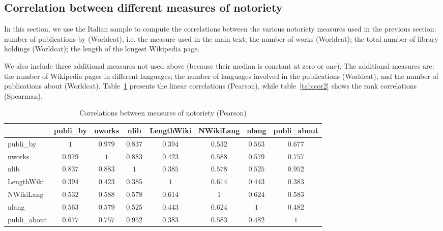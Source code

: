 \subsection{Correlation between different measures of notoriety} \label{app:cor}

In this section, we use the Italian sample to compute the correlations between the various notoriety measures used in the previous section: number of publications by (Worldcat), i.e. the measure used in the main text; the number of works (Worldcat); the total number of library holdings (Worldcat); the length of the longest Wikipedia page.

We also include three additional measures not used above (because their median is constant at zero or one). The additional measures are: the number of Wikipedia pages in different languages; the number of languages involved in the publications (Worldcat), and the number of publications about (Worldcat).
Table~\ref{tab:cor} presents the linear correlations (Pearson), while table~\ref{tab:cor2} shows the rank correlations (Spearman).


\begin{table}[!htbp] \centering
\begin{tabular}{lccccccc}
\toprule
 & publi\_by & nworks & nlib & LengthWiki & NWikiLang & nlang & publi\_about \\
\midrule
publi\_by & $1$ & $0.979$ & $0.837$ & $0.394$ & $0.532$ & $0.563$ & $0.677$ \\
nworks & $0.979$ & $1$ & $0.883$ & $0.423$ & $0.588$ & $0.579$ & $0.757$ \\
nlib & $0.837$ & $0.883$ & $1$ & $0.385$ & $0.578$ & $0.525$ & $0.952$ \\
LengthWiki & $0.394$ & $0.423$ & $0.385$ & $1$ & $0.614$ & $0.443$ & $0.383$ \\
NWikiLang & $0.532$ & $0.588$ & $0.578$ & $0.614$ & $1$ & $0.624$ & $0.583$ \\
nlang & $0.563$ & $0.579$ & $0.525$ & $0.443$ & $0.624$ & $1$ & $0.482$ \\
publi\_about & $0.677$ & $0.757$ & $0.952$ & $0.383$ & $0.583$ & $0.482$ & $1$ \\
\bottomrule
\end{tabular}
  \caption{Correlations between measures of notoriety (Pearson)}
  \label{tab:cor}
\end{table}

